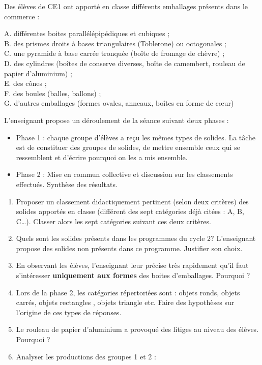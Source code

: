 \begin{exercice}
Des élèves de CE1 ont apporté en classe différents emballages présents dans le commerce :

A. différentes boites parallélépipédiques et cubiques ; \\
B. des prismes droits à bases triangulaires (Toblerone) ou octogonales ; \\
C. une pyramide à base carrée tronquée (boîte de fromage de chèvre) ; \\
D. des cylindres (boîtes de conserve diverses, boîte de camembert, rouleau de papier d'aluminium) ; \\
E. des cônes ; \\
F. des boules (balles, ballons) ; \\
G. d'autres emballages (formes ovales, anneaux, boîtes en forme de c\oe ur)

L'enseignant propose un déroulement de la séance suivant deux phases :
\begin{itemize}
   \item Phase 1 : chaque groupe d'élèves a reçu les mêmes types de solides. La tâche est de constituer des groupes de solides, de mettre ensemble ceux qui se ressemblent et d'écrire pourquoi on les a mis ensemble.
   \item Phase 2 : Mise en commun collective et discussion sur les classements effectués. Synthèse des résultats.
\end{itemize}

\begin{enumerate}
   \item Proposer un classement didactiquement pertinent (selon deux critères) des solides apportés en classe (différent des sept catégories déjà citées : A, B, C\dots). Classer alors les sept catégories suivant ces deux critères.
   \item Quels sont les solides présents dans les programmes du cycle 2? L'enseignant propose des solides non présents dans ce programme. Justifier son choix.
   \item En observant les élèves, l'enseignant leur précise très rapidement qu'il faut s'intéresser {\bf uniquement aux formes} des boites d'emballages. Pourquoi ?
   \item Lors de la phase 2, les catégories répertoriées sont : objets ronds, objets carrés, objets \og rectangles \fg, objets \og triangle \fg{} etc. Faire des hypothèses sur l'origine de ces types de réponses.
   \item Le rouleau de papier d'aluminium a provoqué des litiges au niveau des élèves. Pourquoi ?
   \item Analyser les productions des groupes 1 et 2 :
   

\end{enumerate}
\end{exercice}
